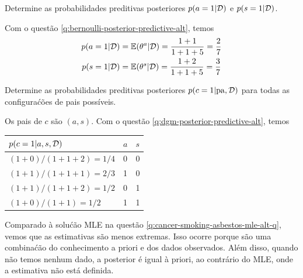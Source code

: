 \begin{exenumerate}
    \item Determine as probabilidades preditivas posteriores $p(a =1 |\mathcal{D})$ e $p(s=1|\mathcal{D})$. 
    \begin{solution}
        Com o  quest\~ao
        \ref{q:bernoulli-posterior-predictive-alt}, temos
        \begin{align}
            p(a =1 |\mathcal{D}) &= \mathbb{E}(\theta^a | \mathcal{D}) = \frac{1 + 1}{1+1+5} = \frac{2}{7}\\
            p(s=1|\mathcal{D}) &=\mathbb{E}(\theta^s | \mathcal{D}) = \frac{1 + 2}{1+1+5} = \frac{3}{7}
        \end{align}
    \end{solution}
    
    \item Determine as probabilidades preditivas posteriores $p(c=1 | \mathrm{pa},
    \mathcal{D})$ para todas as configura\'c\~oes de pais poss\'iveis.
    
    \begin{solution}
        Os pais de $c$ s\~ao $(a,s)$. Com o
         quest\~ao
        \ref{q:dgm-posterior-predictive-alt}, temos
        \begin{center}
            \begin{tabular}{@{}lll@{}}
                \toprule
                $p(c=1 | a,s, \mathcal{D})$ & $a$ & $s$\\
                \midrule
                $(1+0)/(1+1+2)=1/4 $ & 0 & 0\\
                $(1+1)/(1+1+1)=2/3 $ & 1 & 0\\
                $(1+1)/(1+1+2)=1/2 $ & 0 & 1\\
                $(1+0)/(1+1)=1/2 $ & 1 & 1\\
                \bottomrule
            \end{tabular}
        \end{center}
        Comparado \`a solu\'c\~ao MLE na
         quest\~ao
        \ref{q:cancer-smoking-asbestos-mle-alt-q}, vemos que as estimativas s\~ao
        menos extremas. Isso ocorre porque s\~ao uma combina\'c\~ao do
        conhecimento a priori e dos dados observados. Al\'em disso, quando n\~ao temos
        nenhum dado, a posterior \'e igual \`a priori, ao contr\'ario do MLE, onde a
        estimativa n\~ao est\'a definida.
        
    \end{solution}
    
\end{exenumerate}

